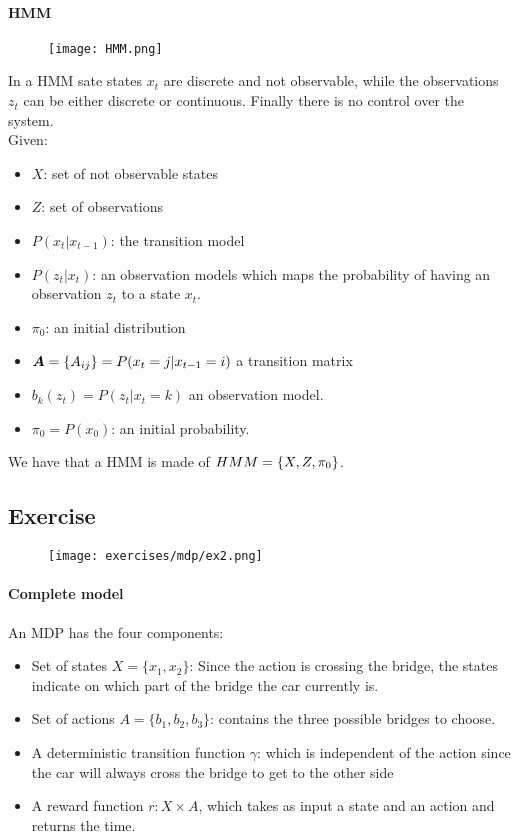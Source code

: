 \paragraph{HMM}
\begin{figure}[H]
    \centering
    \texttt{[image: HMM.png]}
\end{figure}

In a HMM sate states $x_t$ are discrete and not observable, while the observations $z_t$ can be either discrete or continuous. Finally there is no control over the system.\\
Given:
\begin{itemize}
\item $X$: set of not observable states
\item $Z$: set of observations
\item $P(x_t|x_{t-1})$: the transition model 
\item $P(z_t|x_t)$: an observation models which maps the probability of having an observation $z_t$ to a state $x_t$.
\item $\pi_0$: an initial distribution
\item $\bm{A}=\lbrace{A_{ij}}\rbrace=P(x_t=j|x_{t-1}=i)$ a transition matrix
\item $b_k(z_t)=P(z_t|x_t=k)$ an observation model.
\item $\pi_0=P(x_0)$: an initial probability.
\end{itemize}
We have that a HMM is made of $HMM=\lbrace{X,Z,\pi_0}\rbrace$.

\subsection{Exercise}

\begin{figure}[H]
    \centering
    \texttt{[image: exercises/mdp/ex2.png]}
\end{figure}

\paragraph{Complete model}
An MDP has the four components:
\begin{itemize}
\item Set of states $X=\{x_1,x_2\}$: Since the action is crossing the bridge, the states indicate on which part of the bridge the car currently is.
\item Set of actions $A=\{b_1,b_2,b_3\}$: contains the three possible bridges to choose.
\item A deterministic transition function $\gamma$: which is independent of the action since the car will always cross the bridge to get to the other side
\item A reward function $r: X\times A$, which takes as input a state and an action and returns the time. 
\end{itemize}


